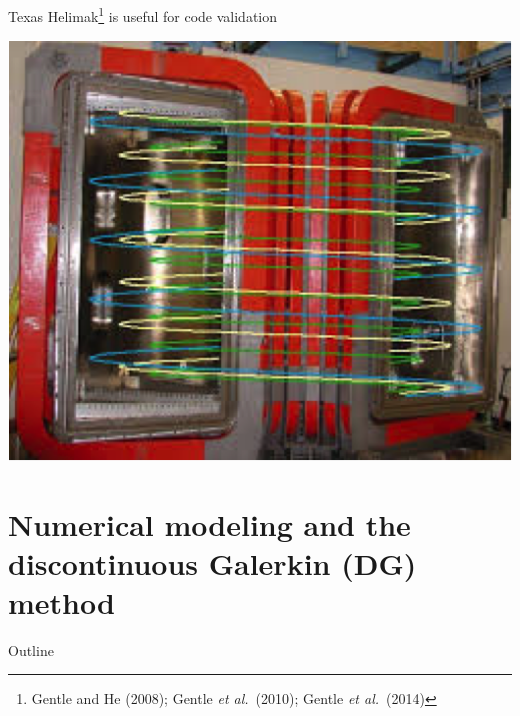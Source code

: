 \documentclass[12pt,table]{beamer}
\newcommand{\etal}{\emph{et al.}}
\begin{document}
\begin{frame}{Texas Helimak\footnote{\scriptsize Gentle and He (2008); Gentle \etal\ (2010); Gentle \etal\ (2014)} is useful for code validation}
\begin{minipage}{0.45\linewidth}
        \smallskip        
        \includegraphics[width=.65\linewidth]{figs/heli-cross-sec2.png}
    \end{minipage}
\end{frame}

\section[Numerical modeling]{Numerical modeling and the {\bf discontinuous Galerkin (DG)} method}

\begin{frame}{Outline}
    \tableofcontents[currentsection] 
\end{frame}
\end{document}
